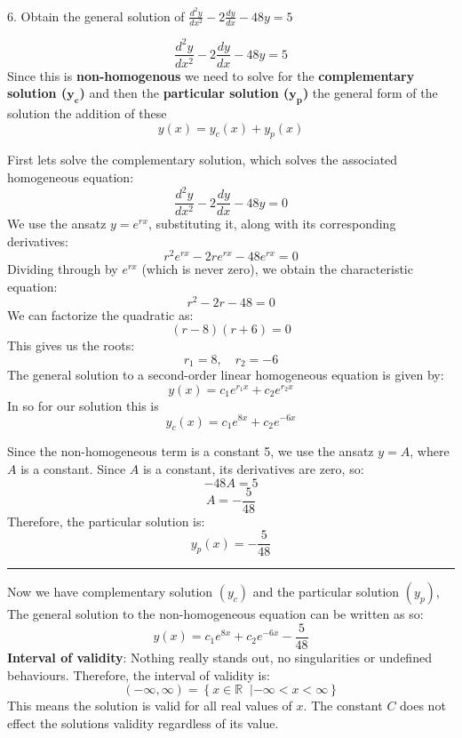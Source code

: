 \documentclass[a4paper, 12pt]{report}
\def\ni{green!60!black!40!white}
\begin{document}
    \newpage
    
    \begin{tcolorbox}[title={\color{black}\section{Q6}}, colback=white, colframe=\ni, boxrule=1mm, width=1\textwidth]
        6. Obtain the general solution of \( \frac{d^2 y}{dx^2} - 2 \frac{dy}{dx} - 48y = 5 \)
    \end{tcolorbox}
        \[ \frac{d^2 y}{dx^2} - 2 \frac{dy}{dx} - 48y = 5 \]
        Since this is \textbf{non-homogenous} we need to solve for the \textbf{complementary solution (\(\bm{y_c}\))} and then the \textbf{particular solution ($\bm{y_p}$)} the general form of the solution the addition of these $$y(x)=y_c(x)+y_p(x)$$
    \begin{minipage}[t]{0.5\textwidth}
            First lets solve the complementary solution, which solves the associated homogeneous equation:
            \[ \frac{d^2 y}{dx^2} - 2 \frac{dy}{dx} - 48y = 0 \]
            We use the ansatz \( y = e^{rx} \), substituting it, along with its corresponding derivatives:
            \[ r^2 e^{rx} - 2r e^{rx} - 48 e^{rx} = 0 \]
            Dividing through by \( e^{rx} \) (which is never zero), we obtain the characteristic equation:
            \[ r^2 - 2r - 48 = 0 \]
            We can factorize the quadratic as:
            \[(r - 8)(r + 6)=0\]
            This gives us the roots:
            \[ r_1 = 8, \quad r_2 = -6 \]
            The general solution to a second-order linear homogeneous equation is given by:
            \[ y(x) = c_1 e^{r_1x} + c_2 e^{r_2x} \]
            In so for our solution this is
            \[ y_c(x) = c_1 e^{8x} + c_2 e^{-6x} \]
    \end{minipage}\hfil%
    \begin{minipage}[t]{0.45\textwidth}
        Since the non-homogeneous term is a constant 5, we use the ansatz \(y=A\), where \(A\) is a constant. Since \(A\) is a constant, its derivatives are zero, so:
        \[-48A = 5\]
        \[A=-\frac{5}{48} \]
        Therefore, the particular solution is:
        \[ y_p(x) = -\frac{5}{48} \]

        \hrule
        \vspace{1em}
        
        Now we have complementary solution \((y_c)\) and the particular solution \((y_p)\), The general solution to the non-homogeneous equation can be written as so:
        \[\boxed{y(x) = c_1 e^{8x} + c_2 e^{-6x} - \frac{5}{48}} \]    
        \textbf{Interval of validity}: Nothing really stands out, no singularities or undefined behaviours. Therefore, the interval of validity is:
            \[(-\infty, \infty) = \left\{x \in \mathbb{R} \;\; | -\infty < x < \infty\right\}\]
        This means the solution is valid for all real values of \(x\). The constant \(C\) does not effect the solutions validity regardless of its value.
    \end{minipage}        
    
\end{document}
